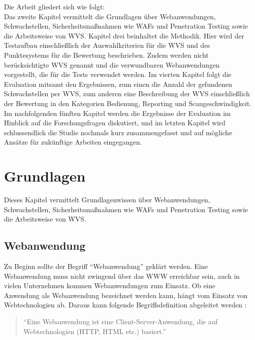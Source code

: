 \documentclass[12pt,oneside,a4paper,parskip,pointlessnumbers]{scrbook}
\begin{document}
Die Arbeit gliedert sich wie folgt:\\
Das zweite Kapitel vermittelt die Grundlagen über Webanwendungen, Schwachstellen,  Sicherheitsmaßnahmen wie \acp{WAF} und Penetration Testing sowie die Arbeitsweise von WVS. Kapitel drei beinhaltet die Methodik. Hier wird der Testaufbau einschließlich der Auswahlkriterien für die WVS und des Punktesystems für die Bewertung beschrieben. Zudem werden nicht berücksichtigte WVS genannt und die verwundbaren Webanwendungen vorgestellt, die für die Tests verwendet werden. Im vierten Kapitel folgt die Evaluation mitsamt den Ergebnissen, zum einen die Anzahl der gefundenen Schwachstellen per WVS, zum anderen eine Beschreibung der WVS einschließlich der Bewertung in den Kategorien Bedienung, Reporting und Scangeschwindigkeit. Im nachfolgenden fünften Kapitel werden die Ergebnisse der Evaluation im Hinblick auf die Forschungsfragen diskutiert, und im letzten Kapitel wird schlussendlich die Studie nochmals kurz zusammengefasst und auf mögliche Ansätze für zukünftige Arbeiten eingegangen.

\chapter{Grundlagen}
Dieses Kapitel vermittelt Grundlagenwissen über Webanwendungen, Schwachstellen, Sicherheitsmaßnahmen wie \acp{WAF} und Penetration Testing sowie die Arbeitsweise von WVS.
  \section{Webanwendung}
  Zu Beginn sollte der Begriff ``Webanwendung'' geklärt werden.
  Eine Webanwendung muss nicht zwingend über das \ac{WWW} erreichbar sein, auch in vielen Unternehmen kommen Webanwendungen zum Einsatz. Ob eine Anwendung als Webanwendung bezeichnet werden kann, hängt vom Einsatz von Webtechnologien ab. Daraus kann folgende Begriffsdefinition abgeleitet werden \cite[S.1]{Rohr}:

  \begin{quote}``Eine Webanwendung ist eine Client-Server-Anwendung, die auf Webtechnologien (HTTP, HTML etc.) basiert.''\end{quote}
\end{document}
